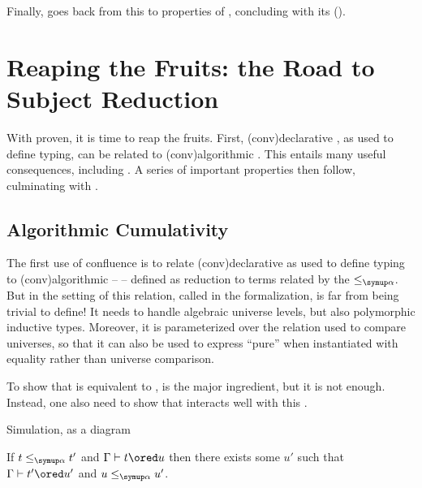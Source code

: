 Finally,  goes back from this to properties of , concluding
with its  ().

\section[The Road to Subject Reduction]{Reaping the Fruits: the Road to Subject Reduction}
\label{sec:meta-typing-prop}

With  proven, it is time to reap the fruits. First,
\kl(conv){declarative} ,
as used to define typing, can be related to \kl(conv){algorithmic} . This entails
many useful consequences, including .
A series of important properties then follow, culminating with .

\subsection{Algorithmic Cumulativity}

The first use of confluence is to relate \kl(conv){declarative} 
as used to define typing to \kl(conv){algorithmic}  –
 –
defined as reduction to terms related by the  $\alphleq$.%
But in the setting of  this relation, called  in
the formalization, is far from being trivial to define!
It needs to handle algebraic universe levels, but also polymorphic inductive types. Moreover,
it is parameterized over the relation used to compare universes, so that it can also be used
to express “pure”  when instantiated with equality rather than
universe comparison.

To show that  is equivalent to ,
 is the major ingredient, but it is not enough. Instead, one also need to show
that  interacts well with this .

\begin{lemma}
  \begin{marginfigure}
    \centering
    \caption{Simulation, as a diagram}
    \label{fig:alphleq-sim}
  \end{marginfigure}
  If $t \alphleq t'$ and $\Gamma \vdash t \ored u$ then there exists some $u'$ such that
  $\Gamma \vdash t' \ored u'$ and $u \alphleq u'$.
\end{lemma}

